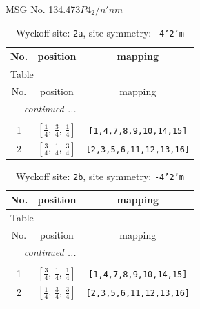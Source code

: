 \documentclass[fleqn,8pt]{jsarticle}
\begin{document}
\setcounter{MaxMatrixCols}{32}

\renewcommand{\tablename}{Table~}
\renewcommand{\figurename}{Figure~}
\begin{center}
\LARGE
MSG No. 134.473\quad$P4_{2}/n'nm$
\end{center}
\renewcommand{\arraystretch}{1.2}
\begin{longtable}{ccc}
\caption{Wyckoff site: {\tt 2a}, site symmetry: {\tt -4'2'm}}
 \\
 \hline \hline
No. & position & mapping \\ \hline \endfirsthead

\multicolumn{2}{l}{\tablename\ \thetable{}} \\
 \hline \hline
No. & position & mapping \\ \hline \endhead

 \hline \hline
\multicolumn{2}{r}{\footnotesize\it continued ...} \\ \endfoot

 \hline \hline
\multicolumn{2}{r}{} \\ \endlastfoot

1 & $\left[ \frac{1}{4},\, \frac{3}{4},\, \frac{1}{4} \right]$ & {\tt [1,4,7,8,9,10,14,15]} \\ \hline
2 & $\left[ \frac{3}{4},\, \frac{1}{4},\, \frac{3}{4} \right]$ & {\tt [2,3,5,6,11,12,13,16]} \\
\end{longtable}
\renewcommand{\arraystretch}{1.2}
\begin{longtable}{ccc}
\caption{Wyckoff site: {\tt 2b}, site symmetry: {\tt -4'2'm}}
 \\
 \hline \hline
No. & position & mapping \\ \hline \endfirsthead

\multicolumn{2}{l}{\tablename\ \thetable{}} \\
 \hline \hline
No. & position & mapping \\ \hline \endhead

 \hline \hline
\multicolumn{2}{r}{\footnotesize\it continued ...} \\ \endfoot

 \hline \hline
\multicolumn{2}{r}{} \\ \endlastfoot

1 & $\left[ \frac{3}{4},\, \frac{1}{4},\, \frac{1}{4} \right]$ & {\tt [1,4,7,8,9,10,14,15]} \\ \hline
2 & $\left[ \frac{1}{4},\, \frac{3}{4},\, \frac{3}{4} \right]$ & {\tt [2,3,5,6,11,12,13,16]} \\
\end{longtable}
\end{document}
